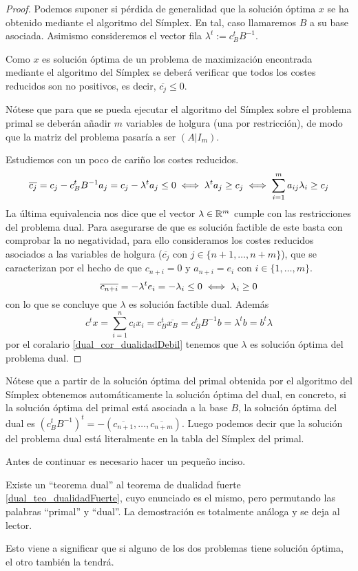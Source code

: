 \begin{proof}
	Podemos suponer si pérdida de generalidad que la solución óptima $x$ se ha obtenido mediante el algoritmo del Símplex. En tal, caso llamaremos $B$ a su base asociada. Asimismo consideremos el vector fila $\lambda^t:=c_B^tB^{-1}$.
	
	Como $x$ es solución óptima de un problema de maximización encontrada mediante el algoritmo del Símplex se deberá verificar que todos los costes reducidos son no positivos, es decir, $\overline{c_j}\leq 0$.
	
	Nótese que para que se pueda ejecutar el algoritmo del Símplex sobre el problema primal se deberán añadir $m$ variables de holgura (una por restricción), de modo que la matriz del problema pasaría a ser $(A|I_m)$.
	
	Estudiemos con un poco de cariño los costes reducidos.
	\begin{equation*}
		\overline{c_j}=c_j-c_B^tB^{-1}a_j=c_j-\lambda^ta_j\leq 0\iff \lambda^ta_j\geq c_j\iff \sum_{i=1}^{m}a_{ij}\lambda_i\geq c_j
	\end{equation*}
	La última equivalencia nos dice que el vector $\lambda\in\mathbb{R}^m$ cumple con las restricciones del problema dual. Para asegurarse de que es solución factible de este basta con comprobar la no negatividad, para ello consideramos los costes reducidos asociados a las variables de holgura ($\overline{c_j}$ con $j\in\{n+1,\dots,n+m\}$), que se caracterizan por el hecho de que $c_{n+i}=0$ y $a_{n+i}=e_i$ con $i\in\{1,\dots,m\}$.
	\begin{equation*}
		\overline{c_{n+i}}=-\lambda^te_i=-\lambda_i\leq 0\iff\lambda_i\geq 0 
	\end{equation*}
	con lo que se concluye que $\lambda$ es solución factible dual. Además
	\begin{equation*}
		c^tx=\sum_{i=1}^{n}c_ix_i=c_B^t\overline{x_B}=c_B^tB^{-1}b=\lambda^tb=b^t\lambda
	\end{equation*}
	por el coralario \ref{dual_cor_dualidadDebil} tenemos que $\lambda$ es solución óptima del problema dual.
\end{proof}
\begin{obs}[Construcción]
	Nótese que a partir de la solución óptima del primal obtenida por el algoritmo del Símplex obtenemos automáticamente la solución óptima del dual, en concreto, si la solución óptima del primal está asociada a la base $B$, la solución óptima del dual es $(c_B^tB^{-1})^t=-(\overline{c_{n+1}},\dots,\overline{c_{n+m}})$. Luego podemos decir que la solución del problema dual está literalmente en la tabla del Símplex del primal.
\end{obs}
Antes de continuar es necesario hacer un pequeño inciso.
\begin{obs}
	\label{dual_obs_dual}
	Existe un ``teorema dual'' al teorema de dualidad fuerte \ref{dual_teo_dualidadFuerte}, cuyo enunciado es el mismo, pero permutando las palabras ``primal'' y ``dual''. La demostración es totalmente análoga y se deja al lector.
	
	Esto viene a significar que si alguno de los dos problemas tiene solución óptima, el otro también la tendrá.
\end{obs}

